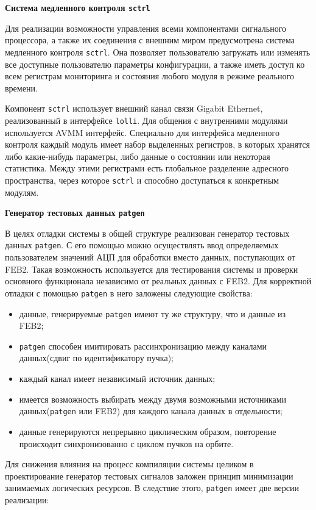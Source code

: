 \textbf{Система медленного контроля \texttt{sctrl}}\par
Для реализации возможности управления всеми компонентами сигнального процессора, а также их соединения с внешним миром предусмотрена система медленного контроля \texttt{sctrl}. Она позволяет пользователю загружать или изменять все доступные пользователю параметры конфигурации, а также иметь доступ ко всем регистрам мониторинга и состояния любого модуля в режиме реального времени.\par
Компонент \texttt{sctrl} использует внешний канал связи Gigabit Ethernet, реализованный в интерфейсе \texttt{lolli}. Для общения с внутренними модулями используется AVMM интерфейс. Специально для интерфейса медленного контроля каждый модуль имеет набор выделенных регистров, в которых хранятся либо какие-нибудь параметры, либо данные о состоянии или некоторая статистика. Между этими регистрами есть глобальное разделение адресного пространства, через которое \texttt{sctrl} и способно доступаться к конкретным модулям.\par
\textbf{Генератор тестовых данных \texttt{patgen}}\par
В целях отладки системы в общей структуре реализован генератор тестовых данных \texttt{patgen}. С его помощью можно осуществлять ввод определяемых пользователем значений АЦП для обработки вместо данных, поступающих от FEB2. Такая возможность используется для тестирования системы и проверки основного функционала независимо от реальных данных с FEB2. Для корректной отладки с помощью \texttt{patgen} в него заложены следующие свойства:\par
\begin{itemize}
    \item данные, генерируемые \texttt{patgen} имеют ту же структуру, что и данные из FEB2;
    \item \texttt{patgen} способен имитировать рассинхронизацию между каналами данных(сдвиг по идентификатору пучка);
    \item каждый канал имеет независимый источник данных;
    \item имеется возможность выбирать между двумя возможными источниками данных(\texttt{patgen} или FEB2) для каждого канала данных в отдельности;
    \item данные генерируются непрерывно циклическим образом, повторение происходит синхронизованно с циклом пучков на орбите.
\end{itemize}\par
Для снижения влияния на процесс компиляции системы целиком в проектирование генератор тестовых сигналов заложен принцип минимизации занимаемых логических ресурсов. В следствие этого, \texttt{patgen} имеет две версии реализации:\par
